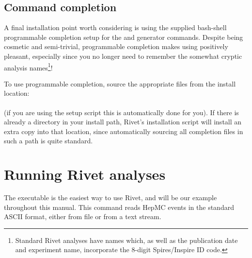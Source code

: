 

\subsection{Command completion}

A final installation point worth considering is using the supplied bash-shell
programmable completion setup for the  and generator %
commands. Despite being cosmetic and semi-trivial, programmable completion makes
using  positively pleasant, especially since you no longer need to
remember the somewhat cryptic analysis names\footnote{Standard Rivet analyses
  have names which, as well as the publication date and experiment name,
  incorporate the 8-digit Spires/Inspire ID code.}!

To use programmable completion, source the appropriate files from the install
location:\\
\\
(if you are using the setup script  this is automatically
done for you).
If there is already a  directory in
your install path, Rivet's installation script will install an extra
copy into that location, since automatically sourcing all completion files in
such a path is quite standard.




\section{Running Rivet analyses}
\label{sec:agile-runmc}

The  executable is the easiest way to use Rivet, and will be our
example throughout this manual. This command reads HepMC events in the standard
ASCII format, either from file or from a text stream.

